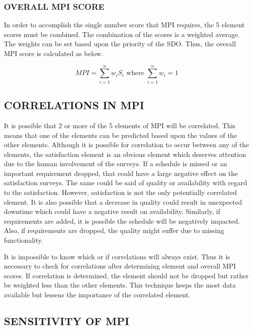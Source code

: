 \documentclass[SDSUThesis.tex]{subfiles}
\begin{document}
        \subsubsection{OVERALL MPI SCORE}
            In order to accomplish the single number score that MPI requires,
            the 5 element scores must be combined. The combination of the scores
            is a weighted average.  The weights can be set based upon the 
            priority of the SDO.  Thus, the overall MPI score is calculated as below.
            
            \[
                MPI =\sum\limits^n_{i=1} w_i S_i \text{ where } \sum\limits^n_{i=1} w_i = 1
            \]


    \subsection{CORRELATIONS IN MPI}
        It is possible that 2 or more of the 5 elements of MPI will be correlated.  This means that
        one of the elements can be predicted based upon the values of the other elements.  Although
        it is possible for correlation to occur between any of the elements, the satisfaction element
        is an obvious element which deserves attention due to the human involvement of the surveys. 
        If a schedule is missed or an important requirement dropped, that could have a large negative
        effect on the satisfaction surveys.  The same could be said of quality or availability with regard to 
        the satisfaction.  However, satisfaction is not the only potentially correlated element.  It is also
        possible that a decrease in quality could result in unexpected downtime which could have a
        negative result on availability.  Similarly, if requirements are added, it is possible the schedule
        will be negatively impacted.  Also, if requirements are dropped, the quality might suffer due
        to missing functionality.  
        
        It is impossible to know which or if correlations will always exist.  Thus it is necessary to
        check for correlations after determining element and overall MPI scores.  
        If correlation is determined, the element should not be dropped but rather be weighted less than
        the other elements.  This technique keeps the most data available but lessens the importance of
        the correlated element. 
        
    \subsection{SENSITIVITY OF MPI}
    \label{sub:sensitivity}
        
\end{document}
